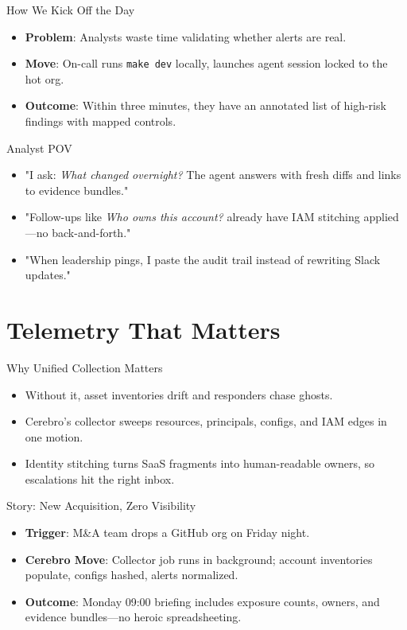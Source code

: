 \documentclass[aspectratio=169]{beamer}
\begin{document}
\begin{frame}{How We Kick Off the Day}
  \begin{itemize}
    \item \textbf{Problem}: Analysts waste time validating whether alerts are real.
    \item \textbf{Move}: On-call runs \texttt{make dev} locally, launches agent session locked to the hot org.
    \item \textbf{Outcome}: Within three minutes, they have an annotated list of high-risk findings with mapped controls.
  \end{itemize}
\end{frame}

\begin{frame}{Analyst POV}
  \begin{itemize}
    \item "I ask: \emph{What changed overnight?} The agent answers with fresh diffs and links to evidence bundles."
    \item "Follow-ups like \emph{Who owns this account?} already have IAM stitching applied—no back-and-forth."
    \item "When leadership pings, I paste the audit trail instead of rewriting Slack updates." 
  \end{itemize}
\end{frame}

\section{Telemetry That Matters}

\begin{frame}{Why Unified Collection Matters}
  \begin{itemize}
    \item Without it, asset inventories drift and responders chase ghosts.
    \item Cerebro's collector sweeps resources, principals, configs, and IAM edges in one motion.
    \item Identity stitching turns SaaS fragments into human-readable owners, so escalations hit the right inbox.
  \end{itemize}
\end{frame}

\begin{frame}{Story: New Acquisition, Zero Visibility}
  \begin{itemize}
    \item \textbf{Trigger}: M\&A team drops a GitHub org on Friday night.
    \item \textbf{Cerebro Move}: Collector job runs in background; account inventories populate, configs hashed, alerts normalized.
    \item \textbf{Outcome}: Monday 09:00 briefing includes exposure counts, owners, and evidence bundles—no heroic spreadsheeting.
  \end{itemize}
\end{frame}
\end{document}
